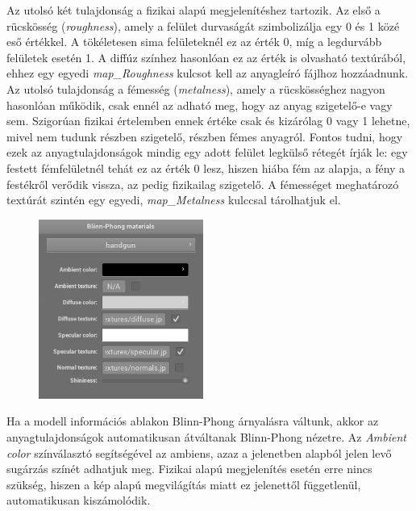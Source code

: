 Az utolsó két tulajdonság a fizikai alapú megjelenítéshez tartozik. Az első a rücskösség (\textit{roughness}), amely a felület durvaságát szimbolizálja egy 0 és 1 közé eső értékkel. A tökéletesen sima felületeknél ez az érték 0, míg a legdurvább felületek esetén 1. A diffúz színhez hasonlóan ez az érték is olvasható textúrából, ehhez egy egyedi \textit{map\_Roughness} kulcsot kell az anyagleíró fájlhoz hozzáadnunk. Az utolsó tulajdonság a fémesség (\textit{metalness}), amely a rücskösséghez nagyon hasonlóan működik, csak ennél az adható meg, hogy az anyag szigetelő-e vagy sem. Szigorúan fizikai értelemben ennek értéke csak és kizárólag 0 vagy 1 lehetne, mivel nem tudunk részben szigetelő, részben fémes anyagról. Fontos tudni, hogy ezek az anyagtulajdonságok mindig egy adott felület legkülső rétegét írják le: egy festett fémfelületnél tehát ez az érték 0 lesz, hiszen hiába fém az alapja, a fény a festékről verődik vissza, az pedig fizikailag szigetelő. A fémességet meghatározó textúrát szintén egy egyedi, \textit{map\_Metalness} kulccsal tárolhatjuk el.

\clearpage

\begin{figure}
    \includegraphics[width=0.48\textwidth]{images/bp_materials.png}
    \vspace{-20pt}
\end{figure}

Ha a modell információs ablakon Blinn-Phong árnyalásra váltunk, akkor az anyagtulajdonságok automatikusan átváltanak Blinn-Phong nézetre. Az \textit{Ambient color} színválasztó segítségével az ambiens, azaz a jelenetben alapból jelen levő sugárzás színét adhatjuk meg. Fizikai alapú megjelenítés esetén erre nincs szükség, hiszen a kép alapú megvilágítás miatt ez jelenettől függetlenül, automatikusan kiszámolódik.

